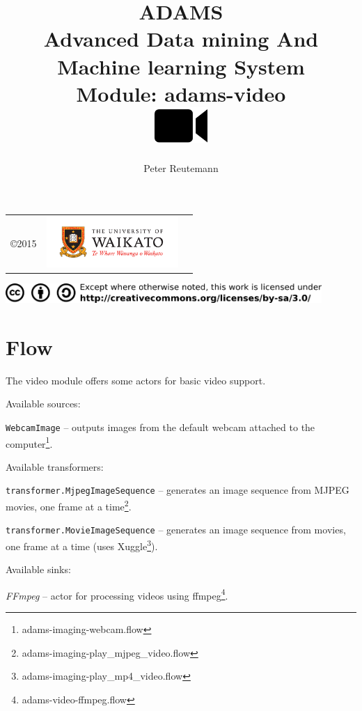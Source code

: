 \documentclass[a4paper]{book}
\title{
  \textbf{ADAMS} \\
  {\Large \textbf{A}dvanced \textbf{D}ata mining \textbf{A}nd \textbf{M}achine
  learning \textbf{S}ystem} \\
  {\Large Module: adams-video} \\
  \vspace{1cm}
  \includegraphics[width=2cm]{images/video-module.png} \\
}
\author{
  Peter Reutemann
}
\begin{document}
\begin{titlepage}
\maketitle

\thispagestyle{empty}
\center
\begin{table}[b]
	\begin{tabular}{c l l}
		\parbox[c][2cm]{2cm}{\copyright 2015} &
		\parbox[c][2cm]{5cm}{\includegraphics[width=5cm]{images/coat_of_arms.pdf}} \\
	\end{tabular}
	\includegraphics[width=12cm]{images/cc.png} \\
\end{table}

\end{titlepage}

\tableofcontents
\listoffigures

\chapter{Flow}
The video module offers some actors for basic video support.

\noindent Available sources:
\begin{tight_itemize}
    \item \texttt{WebcamImage} -- outputs images from the default webcam
    attached to the computer\footnote{adams-imaging-webcam.flow}.
\end{tight_itemize}

\noindent Available transformers:
\begin{tight_itemize}
	\item \texttt{transformer.MjpegImageSequence} -- generates an image sequence
	from MJPEG movies, one frame at a time\footnote{adams-imaging-play\_mjpeg\_video.flow}.
	\item \texttt{transformer.MovieImageSequence} -- generates an image sequence
	from movies, one frame at a time (uses Xuggle\cite{xuggle}\footnote{adams-imaging-play\_mp4\_video.flow}).
\end{tight_itemize}

\noindent Available sinks:
\begin{tight_itemize}
  \item \textit{FFmpeg} -- actor for processing videos using
  ffmpeg\cite{ffmpeg}\footnote{adams-video-ffmpeg.flow}.
\end{tight_itemize}



\end{document}
